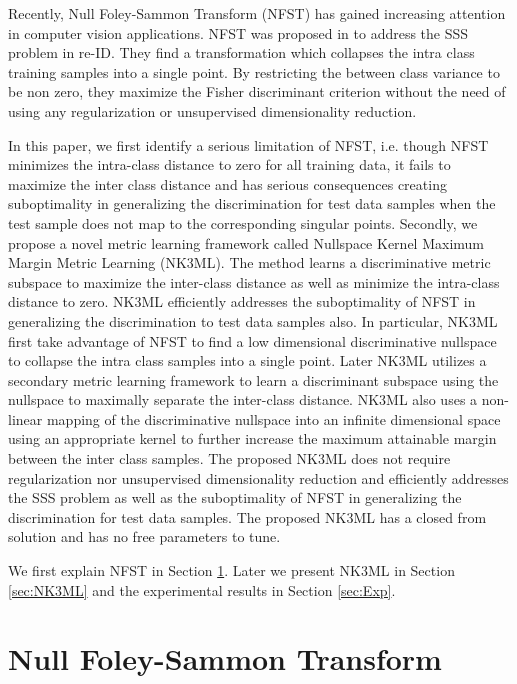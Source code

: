 \documentclass[runningheads]{llncs}
\begin{document}
Recently, Null Foley-Sammon Transform (NFST)\cite{Zheng:nfst,bodesheim:novelty,guo:nfst} has gained increasing attention in computer vision applications. NFST was proposed in \cite{Zheng:nfst} to address the SSS problem in re-ID. They find a transformation which collapses the intra class training samples into a single point. By restricting the between class variance to be non zero, they maximize the Fisher discriminant criterion without the need of using any regularization or unsupervised dimensionality reduction. 

In this paper, we first identify a serious limitation of NFST, i.e. though NFST minimizes the intra-class distance to zero for all training data, it fails to maximize the inter class distance and has serious consequences creating suboptimality in generalizing the discrimination for test data samples when the test sample does not map to the corresponding singular points. Secondly, we propose a novel \color{black}metric learning framework called Nullspace Kernel Maximum Margin Metric Learning (NK3ML). The method learns a discriminative metric subspace to maximize the inter-class distance as well as minimize the intra-class distance to zero. NK3ML efficiently addresses the suboptimality of NFST in generalizing the discrimination to test data samples also. In particular, NK3ML first take advantage of NFST to find a low dimensional discriminative nullspace to collapse the intra class samples into a single point. Later NK3ML utilizes a secondary metric learning framework 
to learn a discriminant subspace using the nullspace to maximally separate the inter-class distance. 
NK3ML also uses a non-linear mapping of the discriminative nullspace into an infinite dimensional space using an appropriate kernel to further increase the maximum attainable margin between the inter class samples. The proposed NK3ML does not require regularization nor unsupervised dimensionality reduction and efficiently addresses the SSS problem as well as the suboptimality of NFST in generalizing the discrimination for test data samples. The proposed NK3ML has a closed from solution and has no free parameters to tune. 

We first explain NFST in Section \ref{sec:NFST}. Later we present NK3ML in Section \ref{sec:NK3ML} and the experimental results in Section \ref{sec:Exp}.

\section{Null Foley-Sammon Transform}
\label{sec:NFST}
\end{document}

